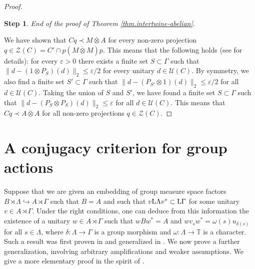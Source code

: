 \documentclass[a4paper,11pt]{amsart}
\numberwithin{equation}{section}
\newtheorem{step}{Step}[section]
\begin{document}
\begin{proof}
\begin{step}
End of the proof of Theorem \ref{thm.intertwine-abelian}.
\end{step}

We have shown that $C q \prec M {\mathbin{\overline{\otimes}}} A$ for every non-zero projection $q \in {\mathcal{Z}}(C) = C' \cap p (M {\mathbin{\overline{\otimes}}} M) p$. This means that the following holds (see \cite[Lemma 2.4 and Proposition 2.5]{Va10} for details): for every ${\varepsilon} > 0$ there exists a finite set $S \subset \Gamma$ such that $\|d-(1 {\otimes} P_S)(d)\|_2 {\leqslant} {\varepsilon} / 2$ for every unitary $d \in {\mathcal{U}}(C)$. By symmetry, we also find a finite set $S' \subset \Gamma$ such that $\|d - (P_{S'} {\otimes} 1)(d)\|_2 {\leqslant} {\varepsilon} /2$ for all $d \in {\mathcal{U}}(C)$. Taking the union of $S$ and $S'$, we have found a finite set $S \subset \Gamma$ such that $\|d - (P_S {\otimes} P_S)(d)\|_2 {\leqslant} {\varepsilon}$ for all $d \in {\mathcal{U}}(C)$. This means that $Cq \prec A {\mathbin{\overline{\otimes}}} A$ for all non-zero projections $q \in {\mathcal{Z}}(C)$.
\end{proof}

\section{A conjugacy criterion for group actions}\label{sec.conjugacy-actions}

Suppose that we are given an embedding of group measure space factors $B \rtimes \Lambda \hookrightarrow A \rtimes \Gamma$ such that $B = A$ and such that $v {\mathord{\text{\rm L}}} \Lambda v^* \subset {\mathord{\text{\rm L}}} \Gamma$ for some unitary $v \in A \rtimes \Gamma$. Under the right conditions, one can deduce from this information the existence of a unitary $w \in A \rtimes \Gamma$ such that $w B w^* = A$ and $w v_s w^* = \omega(s) u_{\delta(s)}$ for all $s \in \Lambda$, where $\delta : \Lambda {\rightarrow} \Gamma$ is a group morphism and $\omega : \Lambda {\rightarrow} {\mathbb{T}}$ is a character. Such a result was first proven in \cite[Theorem 5.2]{Po04} and generalized in \cite[Theorem 7.1]{Io10}. We now prove a further generalization, involving arbitrary amplifications and weaker assumptions. We give a more elementary proof in the spirit of \cite[Proposition 9.3]{Va06}.
\end{document}
